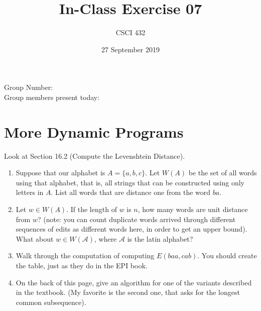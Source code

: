 \documentclass{article}
\title{In-Class Exercise 07}
\author{CSCI 432}
\date{27 September 2019}
\begin{document}
\maketitle

\noindent
Group Number:\\
Group members present today:

\section*{More Dynamic Programs}
Look at Section 16.2 (Compute the Levenshtein Distance).

\begin{enumerate}
\item Suppose that our alphabet is $A=\{a,b,c\}$.  Let $W(A)$ be the set of all
words using that alphabet, that is, all strings that can be constructed
using only letters in $A$.  List all words that are distance one from
the word $ba$.
\vspace{1in}
\item Let $w \in W(A)$.  If the length of $w$ is $n$, how many words are unit
distance from $w$? (note: you
can count duplicate words arrived through different sequences of edits
as different words here, in order to get an upper bound).  What about $w
\in W(\mathcal{A})$, where $\mathcal{A}$ is the latin alphabet?
\vspace{1in}
\item Walk through the computation of computing $E(baa,cab)$.  You should
create the table, just as they do in the EPI book.
\vspace{2in}
\item On the back of this page, give an algorithm for one of the variants described in the textbook.
(My favorite is the second one, that asks for the longest common
subsequence).
\end{enumerate}
\end{document}
